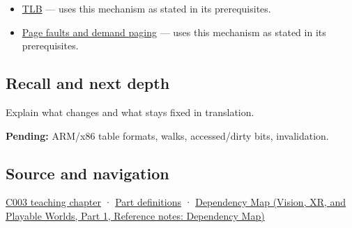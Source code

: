 \hypertarget{appendix-01e5905165c4-used-by}{}

\begin{itemize}
\tightlist
\item
  \hyperref[appendix-7a2d9c5ce511]{TLB} --- uses this mechanism as stated in its prerequisites.
\item
  \hyperref[appendix-cc0909a7ef14]{Page faults and demand paging} --- uses this mechanism as stated in its prerequisites.
\end{itemize}

\subsection{Recall and next depth}\label{appendix-01e5905165c4-recall-and-next-depth}

\hypertarget{appendix-01e5905165c4-recall-and-next-depth}{}

Explain what changes and what stays fixed in translation.

\textbf{Pending:} ARM/x86 table formats, walks, accessed/dirty bits, invalidation.

\subsection{Source and navigation}\label{appendix-01e5905165c4-source-and-navigation}

\hypertarget{appendix-01e5905165c4-source-and-navigation}{}

\hyperref[01-foundations-i-ch002-where-the-bytes-live]{C003 teaching chapter} · \hyperref[appendix-fd090d982a15-m003---parts-41-60]{Part definitions} · \href{../07-Vision-XR-and-Playable-Worlds-P01/main.pdf\#appendix-4ad47bdd269a}{Dependency Map (Vision, XR, and Playable Worlds, Part 1, Reference notes: Dependency Map)}
